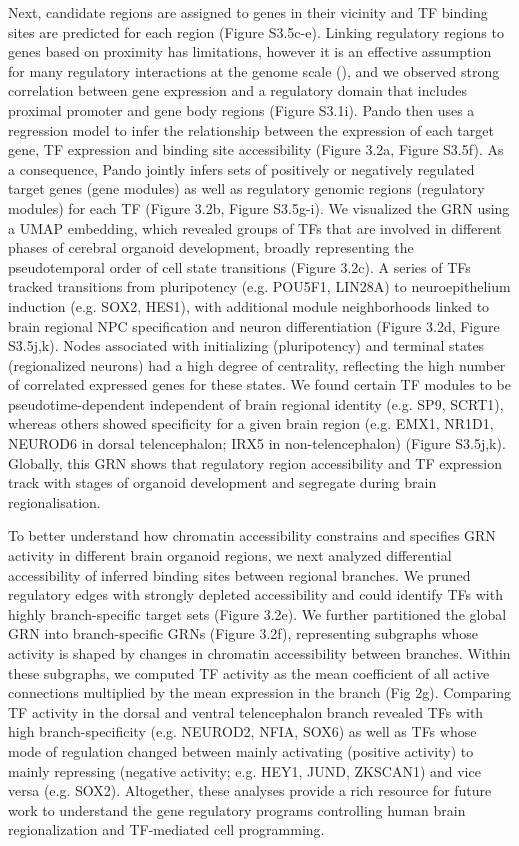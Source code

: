 Next, candidate regions are assigned to genes in their vicinity and TF binding sites are predicted for each region (Figure S3.5c-e). Linking regulatory regions to genes based on proximity has limitations, however it is an effective assumption for many regulatory interactions at the genome scale (\cite{mclean_great_2010,aibar_scenic_2017}), and we observed strong correlation between gene expression and a regulatory domain that includes proximal promoter and gene body regions (Figure S3.1i). Pando then uses a regression model to infer the relationship between the expression of each target gene, TF expression and binding site accessibility (Figure 3.2a, Figure S3.5f). As a consequence, Pando jointly infers sets of positively or negatively regulated target genes (gene modules) as well as regulatory genomic regions (regulatory modules) for each TF (Figure 3.2b, Figure S3.5g-i). We visualized the GRN using a UMAP embedding, which revealed groups of TFs that are involved in different phases of cerebral organoid development, broadly representing the pseudotemporal order of cell state transitions (Figure 3.2c). A series of TFs tracked transitions from pluripotency (e.g. POU5F1, LIN28A) to neuroepithelium induction (e.g. SOX2, HES1), with additional module neighborhoods linked to brain regional NPC specification and neuron differentiation (Figure 3.2d, Figure S3.5j,k). Nodes associated with initializing (pluripotency) and terminal states (regionalized neurons) had a high degree of centrality, reflecting the high number of correlated expressed genes for these states. We found certain TF modules to be pseudotime-dependent independent of brain regional identity (e.g. SP9, SCRT1), whereas others showed specificity for a given brain region (e.g. EMX1, NR1D1, NEUROD6 in dorsal telencephalon; IRX5 in non-telencephalon) (Figure S3.5j,k). Globally, this GRN shows that regulatory region accessibility and TF expression track with stages of organoid development and segregate during brain regionalisation.

To better understand how chromatin accessibility constrains and specifies GRN activity in different brain organoid regions, we next analyzed differential accessibility of inferred binding sites between regional branches. We pruned regulatory edges with strongly depleted accessibility and could identify TFs with highly branch-specific target sets (Figure 3.2e). We further partitioned the global GRN into branch-specific GRNs (Figure 3.2f), representing subgraphs whose activity is shaped by changes in chromatin accessibility between branches. Within these subgraphs, we computed TF activity as the mean coefficient of all active connections multiplied by the mean expression in the branch (Fig 2g). Comparing TF activity in the dorsal and ventral telencephalon branch revealed TFs with high branch-specificity (e.g. NEUROD2, NFIA, SOX6) as well as TFs whose mode of regulation changed between mainly activating (positive activity) to mainly repressing (negative activity; e.g. HEY1, JUND, ZKSCAN1) and vice versa (e.g. SOX2). Altogether, these analyses provide a rich resource for future work to understand the gene regulatory programs controlling human brain regionalization and TF-mediated cell programming.


